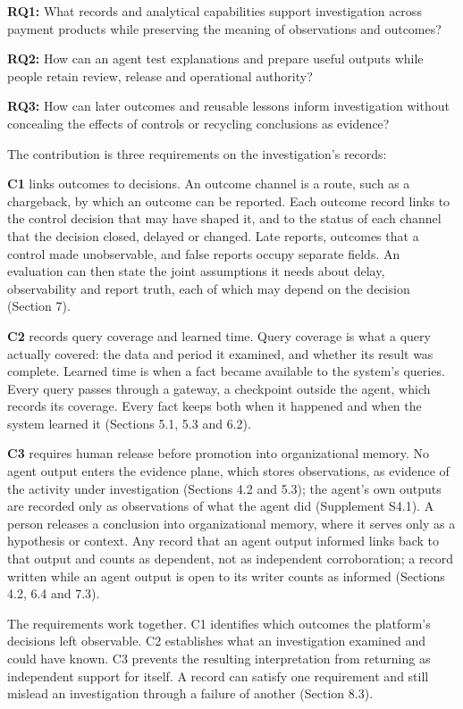 \documentclass[acmlarge,nonacm]{acmart}
\begin{document}
\textbf{RQ1:} What records and analytical capabilities support
investigation across payment products while preserving the meaning of
observations and outcomes?

\textbf{RQ2:} How can an agent test explanations and prepare useful
outputs while people retain review, release and operational authority?

\textbf{RQ3:} How can later outcomes and reusable lessons inform
investigation without concealing the effects of controls or recycling
conclusions as evidence?

The contribution is three requirements on the investigation's records:

\textbf{C1} links outcomes to decisions. An outcome channel is a route,
such as a chargeback, by which an outcome can be reported. Each outcome
record links to the control decision that may have shaped it, and to the
status of each channel that the decision closed, delayed or changed.
Late reports, outcomes that a control made unobservable, and false
reports occupy separate fields. An evaluation can then state the joint
assumptions it needs about delay, observability and report truth, each
of which may depend on the decision (Section 7).

\textbf{C2} records query coverage and learned time. Query coverage is
what a query actually covered: the data and period it examined, and
whether its result was complete. Learned time is when a fact became
available to the system's queries. Every query passes through a gateway,
a checkpoint outside the agent, which records its coverage. Every fact
keeps both when it happened and when the system learned it (Sections
5.1, 5.3 and 6.2).

\textbf{C3} requires human release before promotion into organizational
memory. No agent output enters the evidence plane, which stores
observations, as evidence of the activity under investigation (Sections
4.2 and 5.3); the agent's own outputs are recorded only as observations
of what the agent did (Supplement S4.1). A person releases a conclusion
into organizational memory, where it serves only as a hypothesis or
context. Any record that an agent output informed links back to that
output and counts as dependent, not as independent corroboration; a
record written while an agent output is open to its writer counts as
informed (Sections 4.2, 6.4 and 7.3).

The requirements work together. C1 identifies which outcomes the
platform's decisions left observable. C2 establishes what an
investigation examined and could have known. C3 prevents the resulting
interpretation from returning as independent support for itself. A
record can satisfy one requirement and still mislead an investigation
through a failure of another (Section 8.3).
\end{document}

